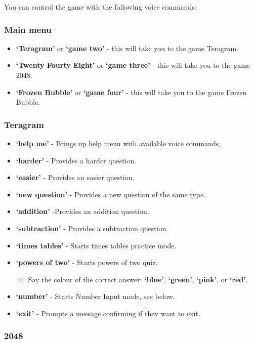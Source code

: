 \documentclass[11pt, oneside]{article}
\begin{document}
You can control the game with the following voice commands:

\subsubsection{Main menu}

\begin{itemize}
  \item {\bf`Teragram'} or {\bf`game two'}  - this will take you to the game Teragram.
  \item {\bf`Twenty Fourty Eight'} or {\bf`game three'} - this will take you to the game 2048.
  \item {\bf`Frozen Bubble'} or {\bf`game four'} - this will take you to the game Frozen Bubble.
\end{itemize}

\subsubsection{Teragram}

\begin{itemize}
  \item {\bf`help me'} - Brings up help menu with available voice commands. 
  \item {\bf`harder'} - Provides a harder question. 
  \item {\bf`easier'} - Provides an easier question.
  \item {\bf`new question'} - Provides a new question of the same type.
  \item {\bf`addition'} -Provides an addition question.
  \item {\bf`subtraction'} - Provides a subtraction question.
  \item {\bf`times tables'} - Starts times tables practice mode.
  \item {\bf`powers of two'} - Starts powers of two quiz.
  \begin{itemize}
  	\item Say the colour of the correct answer: {\bf`blue'}, {\bf`green'}, {\bf`pink'}, or {\bf`red'}.
  \end{itemize}
  \item {\bf`number'} - Starts Number Input mode, see below.
  \item {\bf`exit'} - Prompts a message confirming if they want to exit.
 
\end{itemize}

\subsubsection{2048}
\end{document}

